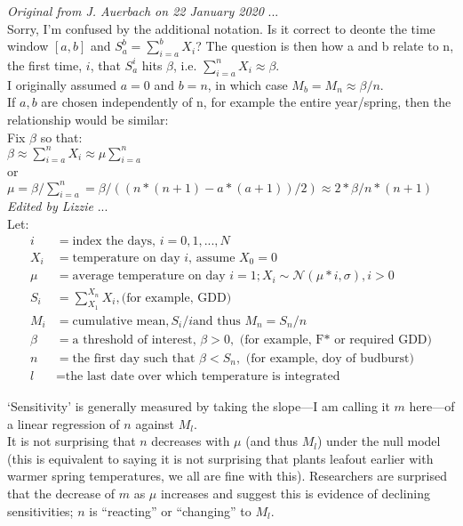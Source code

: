 \documentclass[11pt,letter]{article}
\begin{document}
\emph{Original from J. Auerbach on 22 January 2020} ...\\

Sorry, I'm confused by the additional notation. Is it correct to deonte the time window $[a, b]$ and $S_a^b = \sum_{i = a}^b X_i $?
The question is then how a and b relate to n, the first time, $i$, that $S_a^i$ hits $\beta$, i.e. $\sum_{i=a}^n X_i \approx \beta$.\\

I originally assumed $a = 0$ and $b = n$, in which case $M_b = M_n \approx \beta / n.$ \\

If $a, b$ are chosen independently of n, for example the entire year/spring, then the relationship would be similar:\\
Fix $\beta$ so that:\\
$\beta \approx \sum_{i=a}^n X_i \approx \mu \sum_{i=a}^n$\\
or\\
$\mu = \beta / \sum_{i=a}^n  = \beta / (  (n * (n + 1) - a * (a + 1)) / 2 ) \approx 2 * \beta / n * (n +1)$\\

\emph{Edited by Lizzie} ...\\
Let:
\begin{align*}
i & = \text{index the days, }  i = 0, 1, ..., N\\
X_i & = \text{temperature on day $i$, assume } X_0 = 0\\
\mu & = \text{average temperature on day } i = 1; X_i \sim \mathcal{N}(\mu * i, \sigma), i > 0\\
S_i & = \sum_{X_1}^{X_n} X_i,  \text{(for example, GDD)}\\
M_i & = \text{cumulative mean}, S_i / i \text{and thus } M_n=S_n/n \\
\beta & = \text{a threshold of interest, } \beta > 0, \text{ (for example, F* or required GDD)}\\
n &  = \text{the first day such that }  \beta < S_n, \text{ (for example, doy of budburst)}\\
l &  = \text{the last date over which temperature is integrated}
\end{align*}

`Sensitivity' is generally measured by taking the slope---I am calling it $m$ here---of a linear regression of $n$ against $M_l$.\\

It is not surprising that $n$ decreases with $\mu$ (and thus $M_l$) under the null model (this is equivalent to saying it is not surprising that plants leafout earlier with warmer spring temperatures, we all are fine with this). Researchers are surprised that the decrease of $m$ as $\mu$ increases and suggest this is evidence of declining sensitivities; $n$ is ``reacting'' or ``changing'' to $M_l$.\\
\end{document}
